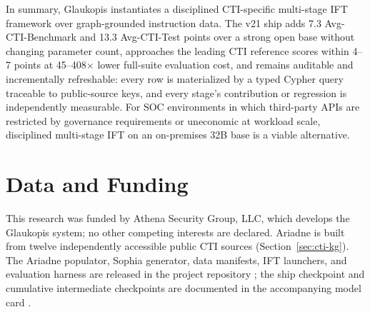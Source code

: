 \documentclass[conference]{IEEEtran}
\begin{document}
In summary, Glaukopis instantiates a disciplined CTI-specific multi-stage IFT framework over graph-grounded instruction data. The v21 ship adds 7.3 Avg-CTI-Benchmark and 13.3 Avg-CTI-Test points over a strong open base without changing parameter count, approaches the leading CTI reference scores within 4--7 points at 45--408$\times$ lower full-suite evaluation cost, and remains auditable and incrementally refreshable: every row is materialized by a typed Cypher query traceable to public-source keys, and every stage's contribution or regression is independently measurable. For SOC environments in which third-party APIs are restricted by governance requirements or uneconomic at workload scale, disciplined multi-stage IFT on an on-premises 32B base is a viable alternative.

\section*{Data and Funding}
This research was funded by Athena Security Group, LLC, which develops the Glaukopis system; no other competing interests are declared. Ariadne is built from twelve independently accessible public CTI sources (Section~\ref{sec:cti-kg}). The Ariadne populator, Sophia generator, data manifests, IFT launchers, and evaluation harness are released in the project repository \cite{glaukopis2026repo}; the ship checkpoint and cumulative intermediate checkpoints are documented in the accompanying model card \cite{glaukopis2026model}.



\end{document}
